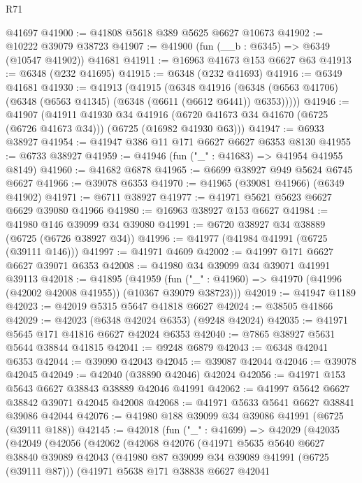\begin{lexlean}{R71}
\begin{coremodule}
    @41697
@41900 := @41808 @5618 @389 @5625 @6627 @10673
@41902 := @10222 @39079 @38723
@41907 := @41900 (fun (__b : @6345) => @6349 (@10547 @41902)) @41681
@41911 := @16963 @41673 @153 @6627 @63
@41913 := @6348 (@232 @41695)
@41915 := @6348 (@232 @41693)
@41916 := @6349 @41681
@41930 := @41913
    (@41915
      (@6348
        @41916
        (@6348 (@6563 @41706) (@6348 (@6563 @41345) (@6348 (@6611 (@6612 @6441)) @6353)))))
@41946 := @41907
    (@41911
      @41930
      @34
      @41916
      (@6720 @41673 @34 @41670 (@6725 (@6726 @41673 @34)))
      (@6725 (@16982 @41930 @63)))
@41947 := @6933 @38927
@41954 := @41947 @386 @11 @171 @6627 @6627 @6353 @8130
@41955 := @6733 @38927
@41959 := @41946 (fun ("_" : @41683) => @41954 @41955 @8149)
@41960 := @41682 @6878
@41965 := @6699 @38927 @949 @5624 @6745 @6627
@41966 := @39078 @6353
@41970 := @41965 (@39081 @41966) (@6349 @41902)
@41971 := @6711 @38927
@41977 := @41971 @5621 @5623 @6627 @6629 @39080 @41966
@41980 := @16963 @38927 @153 @6627
@41984 := @41980 @146 @39099 @34 @39080
@41991 := @6720 @38927 @34 @38889 (@6725 (@6726 @38927 @34))
@41996 := @41977 (@41984 @41991 (@6725 (@39111 @146)))
@41997 := @41971 @4609
@42002 := @41997 @171 @6627 @6627 @39071 @6353
@42008 := @41980 @34 @39099 @34 @39071 @41991 @39113
@42018 := @41895
    (@41959 (fun ("_" : @41960) => @41970 (@41996 (@42002 @42008 @41955)) (@10367 @39079 @38723)))
@42019 := @41947 @1189
@42023 := @42019 @5315 @5647 @41818 @6627
@42024 := @38505 @41866
@42029 := @42023 (@6348 @42024 @6353) (@9248 @42024)
@42035 := @41971 @5645 @171 @41816 @6627 @42024 @6353
@42040 := @7865 @38927 @5631 @5644 @38844 @41815
@42041 := @9248 @6879
@42043 := @6348 @42041 @6353
@42044 := @39090 @42043
@42045 := @39087 @42044
@42046 := @39078 @42045
@42049 := @42040 (@38890 @42046) @42024
@42056 := @41971 @153 @5643 @6627 @38843 @38889 @42046 @41991
@42062 := @41997 @5642 @6627 @38842 @39071 @42045 @42008
@42068 := @41971 @5633 @5641 @6627 @38841 @39086 @42044
@42076 := @41980 @188 @39099 @34 @39086 @41991 (@6725 (@39111 @188))
@42145 := @42018
    (fun ("_" : @41699) =>
    @42029
      (@42035
        (@42049
          (@42056
            (@42062
              (@42068
                @42076
                (@41971
                  @5635
                  @5640
                  @6627
                  @38840
                  @39089
                  @42043
                  (@41980 @87 @39099 @34 @39089 @41991 (@6725 (@39111 @87)))
                  (@41971
                    @5638
                    @171
                    @38838
                    @6627
                    @42041

\end{coremodule}
\end{lexlean}
